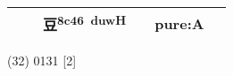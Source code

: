 \documentclass[14pt,a4paper]{scrartcl}
\begin{document}
\begin{longtable}[c]{@{}llllll@{}}
\begin{minipage}[t]{0.14\columnwidth}
\strut\end{minipage} &
\begin{minipage}[t]{0.14\columnwidth}\raggedright\strut
\strut\end{minipage} &
\begin{minipage}[t]{0.14\columnwidth}\raggedright\strut
豆\textsuperscript{8c46~duwH}
\strut\end{minipage} &
\begin{minipage}[t]{0.14\columnwidth}\raggedright\strut
\strut\end{minipage} &
\begin{minipage}[t]{0.14\columnwidth}\raggedright\strut
pure:A
\strut\end{minipage}\tabularnewline
\bottomrule
\end{longtable}

(32) 0131 {[}2{]}
\end{document}
